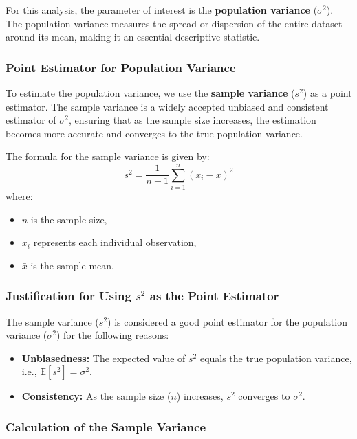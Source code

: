 \documentclass[12pt,a4paper]{article}
\begin{document}
For this analysis, the parameter of interest is the \textbf{population variance} (\(\sigma^2\)). The population variance measures the spread or dispersion of the entire dataset around its mean, making it an essential descriptive statistic.

\subsubsection*{Point Estimator for Population Variance}

To estimate the population variance, we use the \textbf{sample variance} (\(s^2\)) as a point estimator. The sample variance is a widely accepted unbiased and consistent estimator of \(\sigma^2\), ensuring that as the sample size increases, the estimation becomes more accurate and converges to the true population variance.

The formula for the sample variance is given by:
\vspace{1em}
\[
s^2 = \frac{1}{n-1} \sum_{i=1}^{n} (x_i - \bar{x})^2
\]
where:
\begin{itemize}
    \item \(n\) is the sample size,
    \item \(x_i\) represents each individual observation,
    \item \(\bar{x}\) is the sample mean.
\end{itemize}

\subsubsection*{Justification for Using \(s^2\) as the Point Estimator}

The sample variance (\(s^2\)) is considered a good point estimator for the population variance (\(\sigma^2\)) for the following reasons:
\begin{itemize}
    \item \textbf{Unbiasedness:} The expected value of \(s^2\) equals the true population variance, i.e., \(\mathbb{E}[s^2] = \sigma^2\).
    \item \textbf{Consistency:} As the sample size (\(n\)) increases, \(s^2\) converges to \(\sigma^2\).
\end{itemize}

\subsubsection*{Calculation of the Sample Variance}
\end{document}
